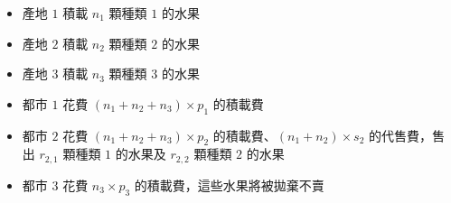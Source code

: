 \begin{itemize}
\tightlist
\item
  產地 \begin{math}1\end{math} 積載 \begin{math}n_1\end{math} 顆種類
  \begin{math}1\end{math} 的水果
\item
  產地 \begin{math}2\end{math} 積載 \begin{math}n_2\end{math} 顆種類
  \begin{math}2\end{math} 的水果
\item
  產地 \begin{math}3\end{math} 積載 \begin{math}n_3\end{math} 顆種類
  \begin{math}3\end{math} 的水果
\item
  都市 \begin{math}1\end{math} 花費
  \begin{math}(n_1 + n_2 + n_3) \times p_1\end{math} 的積載費
\item
  都市 \begin{math}2\end{math} 花費
  \begin{math}(n_1 + n_2 + n_3) \times p_2\end{math}
  的積載費、\begin{math}(n_1 + n_2) \times s_2\end{math} 的代售費，售出
  \begin{math}r_{2,1}\end{math} 顆種類 \begin{math}1\end{math} 的水果及
  \begin{math}r_{2, 2}\end{math} 顆種類 \begin{math}2\end{math} 的水果
\item
  都市 \begin{math}3\end{math} 花費 \begin{math}n_3 \times p_3\end{math}
  的積載費，這些水果將被拋棄不賣
\end{itemize}

